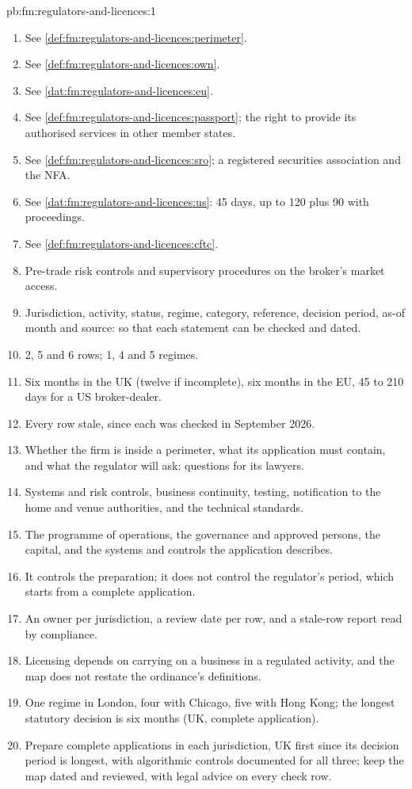 \begin{solution}{pb:fm:regulators-and-licences:1}
\begin{enumerate}
\item See \cref{def:fm:regulators-and-licences:perimeter}.
\item See \cref{def:fm:regulators-and-licences:own}.
\item See \cref{dat:fm:regulators-and-licences:eu}.
\item See \cref{def:fm:regulators-and-licences:passport}; the right to provide its authorised services in other member states.
\item See \cref{def:fm:regulators-and-licences:sro}; a registered securities association and the NFA.
\item See \cref{dat:fm:regulators-and-licences:us}: 45 days, up to 120 plus 90 with proceedings.
\item See \cref{def:fm:regulators-and-licences:cftc}.
\item Pre-trade risk controls and supervisory procedures on the broker's market access.
\item Jurisdiction, activity, status, regime, category, reference, decision period, as-of month and source: so that each statement can be checked
and dated.
\item 2, 5 and 6 rows; 1, 4 and 5 regimes.
\item Six months in the UK (twelve if incomplete), six months in the EU, 45 to 210 days for a US broker-dealer.
\item Every row stale, since each was checked in September 2026.
\item Whether the firm is inside a perimeter, what its application must contain, and what the regulator will ask: questions for its lawyers.
\item Systems and risk controls, business continuity, testing, notification to the home and venue authorities, and the technical standards.
\item The programme of operations, the governance and approved persons, the capital, and the systems and controls the application describes.
\item It controls the preparation; it does not control the regulator's period, which starts from a complete application.
\item An owner per jurisdiction, a review date per row, and a stale-row report read by compliance.
\item Licensing depends on carrying on a business in a regulated activity, and the map does not restate the ordinance's definitions.
\item One regime in London, four with Chicago, five with Hong Kong; the longest statutory decision is six months (UK, complete application).
\item Prepare complete applications in each jurisdiction, UK first since its decision period is longest, with algorithmic controls documented for
all three; keep the map dated and reviewed, with legal advice on every check row.
\end{enumerate}
\end{solution}

